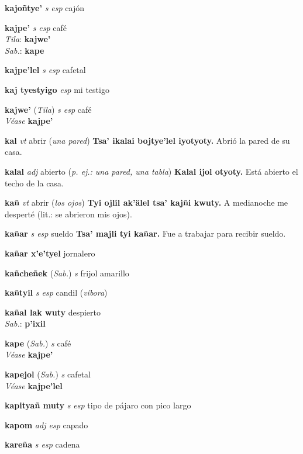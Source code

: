 \documentclass[10pt]{scrbook}
\newcommand{\entry}[1]{\textbf{#1}}
\newcommand{\partofspeech}[1]{\textit{#1}}
\newcommand{\spanishtranslation}[1]{#1}
\newcommand{\clarification}[1]{(\textit{#1})}
\newcommand{\cholexample}[1]{\textbf{#1}}
\newcommand{\exampletranslation}[1]{#1}
\newcommand{\dialectvariant}[1]{\\\textit{#1}:}
\newcommand{\dialectword}[1]{\textbf{#1}}
\newcommand{\alsosee}[1]{\\\textit{Véase} \textbf{#1}}
\newcommand{\relevantdialect}[1]{(\textit{#1})}
\begin{document}
\begin{multicols}{2}
\entry{kajoñtye'}
\partofspeech{s esp}
\spanishtranslation{cajón}

\entry{kajpe'}
\partofspeech{s esp}
\spanishtranslation{café}
\dialectvariant{Tila}
\dialectword{kajwe'}
\dialectvariant{Sab.}
\dialectword{kape}

\entry{kajpe'lel}
\partofspeech{s esp}
\spanishtranslation{cafetal}

\entry{kaj tyestyigo}
\partofspeech{esp}
\spanishtranslation{mi testigo}

\entry{kajwe'}
\relevantdialect{Tila}
\partofspeech{s esp}
\spanishtranslation{café}
\alsosee{kajpe'}

\entry{kal}
\partofspeech{vt}
\spanishtranslation{abrir}
\clarification{una pared}
\cholexample{Tsa' ikalai bojtye'lel iyotyoty.}
\exampletranslation{Abrió la pared de su casa.}

\entry{kalal}
\partofspeech{adj}
\spanishtranslation{abierto}
\clarification{p. ej.: una pared, una tabla}
\cholexample{Kalal ijol otyoty.}
\exampletranslation{Está abierto el techo de la casa.}

\entry{kañ}
\partofspeech{vt}
\spanishtranslation{abrir}
\clarification{los ojos}
\cholexample{Tyi ojlil ak'älel tsa' kajñi kwuty.}
\exampletranslation{A medianoche me desperté (lit.: se abrieron mis ojos).}

\entry{kañar}
\partofspeech{s esp}
\spanishtranslation{sueldo}
\cholexample{Tsa' majli tyi kañar.}
\exampletranslation{Fue a trabajar para recibir sueldo.}

\entry{kañar x'e'tyel}
\spanishtranslation{jornalero}

\entry{kañcheñek}
\relevantdialect{Sab.}
\partofspeech{s}
\spanishtranslation{frijol amarillo}

\entry{kañtyil}
\partofspeech{s esp}
\spanishtranslation{candil}
\clarification{víbora}

\entry{kañal lak wuty}
\spanishtranslation{despierto}
\dialectvariant{Sab.}
\dialectword{p'ixil}

\entry{kape}
\relevantdialect{Sab.}
\partofspeech{s}
\spanishtranslation{café}
\alsosee{kajpe'}

\entry{kapejol}
\relevantdialect{Sab.}
\partofspeech{s}
\spanishtranslation{cafetal}
\alsosee{kajpe'lel}

\entry{kapityañ muty}
\partofspeech{s esp}
\spanishtranslation{tipo de pájaro con pico largo}

\entry{kapom}
\partofspeech{adj esp}
\spanishtranslation{capado}

\entry{kareña}
\partofspeech{s esp}
\spanishtranslation{cadena}


\end{multicols}
\end{document}
